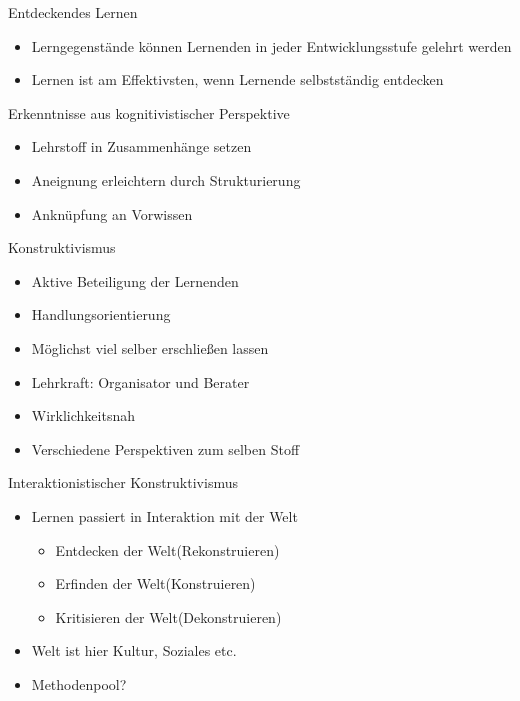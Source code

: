 \documentclass{article}
\begin{document}
\begin{block}{Entdeckendes Lernen}
    \begin{itemize}
        \item Lerngegenstände können Lernenden in jeder Entwicklungsstufe gelehrt werden
        \item Lernen ist am Effektivsten, wenn Lernende selbstständig entdecken
    \end{itemize}
\end{block}

\begin{block}{Erkenntnisse aus kognitivistischer Perspektive}
    \begin{itemize}
        \item Lehrstoff in Zusammenhänge setzen
        \item Aneignung erleichtern durch Strukturierung
        \item Anknüpfung an Vorwissen
    \end{itemize}
\end{block}

\begin{block}{Konstruktivismus}
    \begin{itemize}
        \item Aktive Beteiligung der Lernenden
        \item Handlungsorientierung
        \item Möglichst viel selber erschließen lassen
        \item Lehrkraft: Organisator und Berater
        \item Wirklichkeitsnah
        \item Verschiedene Perspektiven zum selben Stoff
    \end{itemize}
\end{block}

\begin{block}{Interaktionistischer Konstruktivismus}
    \begin{itemize}
        \item Lernen passiert in Interaktion mit der Welt
        \begin{itemize}
            \item Entdecken der Welt(Rekonstruieren)
            \item Erfinden der Welt(Konstruieren)
            \item Kritisieren der Welt(Dekonstruieren)
        \end{itemize}
        \item Welt ist hier Kultur, Soziales etc.
        \item Methodenpool?
    \end{itemize}
\end{block}
\end{document}
